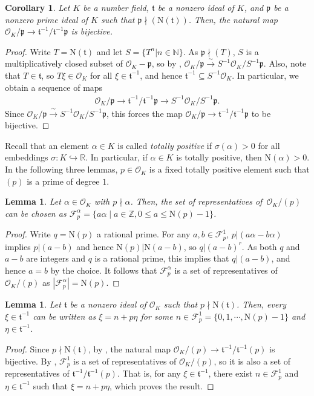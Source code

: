 \documentclass[11pt]{amsart}
\newtheorem{lemma}[theorem]{Lemma}
\newtheorem{corol}[theorem]{Corollary}
\theoremstyle{remark}
\newcommand\cl[1]{\mathcal{#1}}
\newcommand\fr[1]{\mathfrak{#1}}
\newcommand{\inte}{\mathbb{Z}}
\newcommand{\real}{\mathbb{R}}
\newcommand{\nat}{\mathbb{N}}
\newcommand{\clo}{\mathcal{O}}
\newcommand{\simarrow}{\xrightarrow{\;\sim\;}}
\newcommand{\N}{\mathrm{N}}
\begin{document}
\begin{corol}
\label{ideal-local-quotient}
Let $K$ be a number field, $\fr{t}$ be a nonzero ideal of $K$, and $\fr{p}$ be a nonzero prime ideal of $K$ such that $\fr{p}\nmid(\N(\fr{t}))$. Then, the natural map $\clo_K/\fr{p}\rightarrow\fr{t}^{-1}/\fr{t}^{-1}\fr{p}$ is bijective.
\end{corol}
\begin{proof}
Write $T=\N(\fr{t})$ and let $S=\{T^n|n\in\nat\}$. As $\fr{p}\nmid (T)$, $S$ is a multiplicatively closed subset of $\clo_K-\fr{p}$, so by , $\clo_K/\fr{p}\simarrow S^{-1}\clo_K/S^{-1}\fr{p}$. Also, note that $T\in\fr{t}$, so $T\xi\in\clo_K$ for all $\xi\in\fr{t}^{-1}$, and hence $\fr{t}^{-1}\subseteq S^{-1}\clo_K$. In particular, we obtain a sequence of maps
\begin{align*}
    \clo_K/\fr{p}\rightarrow \fr{t}^{-1}/\fr{t}^{-1}\fr{p}\rightarrow S^{-1}\clo_K/S^{-1}\fr{p}. 
\end{align*}
Since $\clo_K/\fr{p}\simarrow S^{-1}\clo_K/S^{-1}\fr{p}$, this forces the map $\clo_K/\fr{p}\rightarrow\fr{t}^{-1}/\fr{t}^{-1}\fr{p}$ to be bijective.
\end{proof}

Recall that an element $\alpha\in K$ is called \textit{totally positive} if $\sigma(\alpha)>0$ for all embeddings $\sigma:K\hookrightarrow\real$. In particular, if $\alpha\in K$ is totally positive, then $\N(\alpha)>0$. In the following three lemmas, $p\in\clo_K$ is a fixed totally positive element such that $(p)$ is a prime of degree $1$.

\begin{lemma}
\label{standardfp}
Let $\alpha\in\clo_K$ with $p\nmid\alpha$. Then, the set of representatives of~$\clo_K/(p)$ can be chosen as $\cl{F}_p^\alpha=\{a\alpha\mid a\in\inte, 0\leq a\leq \N(p)-1\}$.
\end{lemma}
\begin{proof}
Write $q=\N(p)$ a rational prime. For any $a,b\in \cl{F}_p^1$, $p|(a\alpha-b\alpha)$ implies $p|(a-b)$ and hence $\N(p)|\N(a-b)$, so $q|(a-b)^r$. As both $q$ and $a-b$ are integers and $q$ is a rational prime, this implies that $q|(a-b)$, and hence $a=b$ by the choice. It follows that $\cl{F}_p^\alpha$ is a set of representatives of $\clo_K/(p)$ as $|\cl{F}_p^\alpha|=\N(p)$.
\end{proof}

\begin{lemma}
\label{xi-represent}
Let $\fr{t}$ be a nonzero ideal of $\clo_K$ such that $p\nmid\N(\fr{t})$. Then, every $\xi\in\fr{t}^{-1}$ can be written as $\xi=n+p\eta$ for some $n\in\cl{F}_p^1=\{0,1,\cdots,\N(p)-1\}$ and $\eta\in\fr{t}^{-1}$.
\end{lemma}
\begin{proof}
Since $p\nmid\N(\fr{t})$, by , the natural map $\clo_K/(p)\rightarrow\fr{t}^{-1}/\fr{t}^{-1}(p)$ is bijective. By , $\cl{F}_p^1$ is a set of representatives of $\clo_K/(p)$, so it is also a set of representatives of $\fr{t}^{-1}/\fr{t}^{-1}(p)$. That is, for any $\xi\in\fr{t}^{-1}$, there exist $n\in\cl{F}_p^1$ and $\eta\in\fr{t}^{-1}$ such that $\xi=n+p\eta$, which proves the result.
\end{proof}
\end{document}
